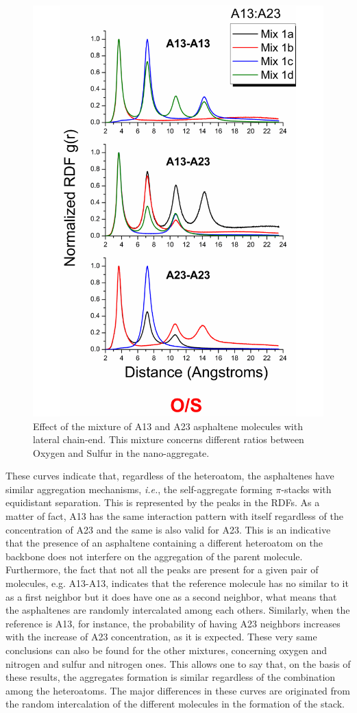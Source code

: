 \begin{figure}[htb]
	\centering
	\includegraphics[width=0.4\columnwidth]{image/06a} 
	\caption{Effect of the mixture of A13 and A23 asphaltene molecules with  lateral chain-end. This mixture concerns different ratios between Oxygen and Sulfur in the nano-aggregate.}
	\label{pap:fig22}
\end{figure}

These curves indicate that, regardless of the heteroatom, the asphaltenes have similar aggregation mechanisms, \textit{i.e.}, the self-aggregate forming $\pi$-stacks with equidistant separation. This is represented by the peaks in the RDFs. As a matter of fact, A13 has the same interaction pattern with itself regardless of the concentration of A23 and the same is also valid for A23. This is an indicative that the presence of an asphaltene containing a different heteroatom on the backbone does not interfere on the aggregation of the parent molecule. Furthermore, the fact that not all the peaks are present for a given pair of molecules, e.g. A13-A13, indicates that the reference molecule has no similar to it as a first neighbor but it does have one as a second neighbor, what means that the asphaltenes are randomly intercalated among each others. Similarly, when the reference is A13, for instance, the probability of having A23 neighbors increases with the increase of A23 concentration, as it is expected. These very same conclusions can also be found for the other mixtures, concerning oxygen and nitrogen and sulfur and nitrogen ones.  This allows one to say that, on the basis of these results, the aggregates formation is similar regardless of the combination among the heteroatoms. The major differences in these curves are originated from the random intercalation of the different molecules in the formation of the stack. 

